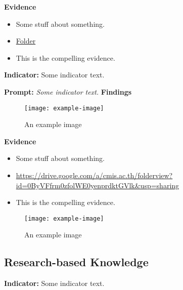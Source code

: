 \documentclass{report}
\begin{document}
\noindent\textbf{Evidence}
\vspace{-\topsep}

\begin{itemize}[leftmargin=*]
\setlength{\parskip}{0pt}
\setlength{\itemsep}{0pt plus 1pt}
\item Some stuff about something.
\item \href{https://drive.google.com/a/cmis.ac.th/folderview?id=0ByVFfrm0zfolWE0yenprdktGVlk&usp=sharing}{Folder}
\item This is the compelling evidence.
\end{itemize}

\noindent\textbf{Indicator:} Some indicator text.

\noindent\textbf{Prompt:} \textit{Some indicator text.}
\noindent\textbf{Findings}

\blindtext

\blinditemize[6]

\blindtext

\begin{figure}[h!]
\caption[An example image]{An example image}
\centering
\texttt{[image: example-image]}
\end{figure}


\noindent\textbf{Evidence}
\vspace{-\topsep}

\begin{itemize}[leftmargin=*]
\setlength{\parskip}{0pt}
\setlength{\itemsep}{0pt plus 1pt}
\item Some stuff about something.
\item \url{https://drive.google.com/a/cmis.ac.th/folderview?id=0ByVFfrm0zfolWE0yenprdktGVlk&usp=sharing}
\item This is the compelling evidence.
\end{itemize}

\begin{figure}[h!]
\caption[An example image]{An example image}
\centering
\texttt{[image: example-image]}
\end{figure}


\subsection{Research-based Knowledge}
\blindtext

\blindtext
 
\noindent\textbf{Indicator:} Some indicator text.
\end{document}
